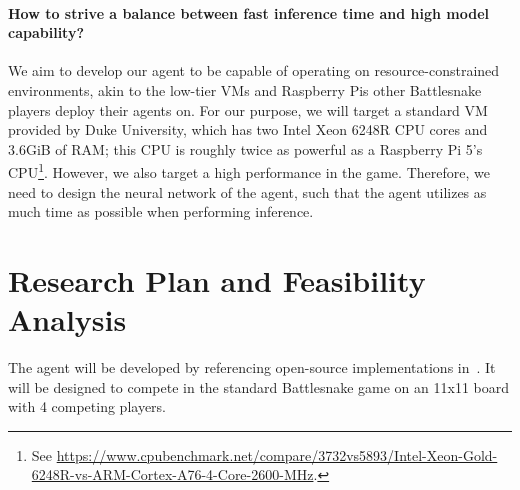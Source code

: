\documentclass[a4paper]{article}
\newcommand{\todo}[1]{\textcolor{red}{[ #1 ]}}
\renewcommand{\todo}[1]{} %
\begin{document}
\paragraph{How to strive a balance between fast inference time and high model
    capability?
}
We aim to develop our agent to be capable of operating on resource-constrained
environments,
akin to the low-tier VMs and Raspberry Pis other Battlesnake players deploy
their agents on. For our purpose,
we will target a standard VM provided by Duke University,
which has two Intel Xeon 6248R CPU cores and 3.6GiB of RAM;
this CPU is roughly twice as powerful as a Raspberry Pi 5's CPU\footnote{See
    \url{https://www.cpubenchmark.net/compare/3732vs5893/Intel-Xeon-Gold-6248R-vs-ARM-Cortex-A76-4-Core-2600-MHz}.
}. However, we also target a high performance in the game. Therefore,
we need to design the neural network of the agent,
such that the agent utilizes as much time as possible when performing inference.

\section{Research Plan and Feasibility Analysis}

\todo{including research methods, technical routes, experimental methods,
    key technologies, etc.}

The agent will be developed by referencing open-source implementations
in~\cite{siddiqui2020multiagent,chung2020battlesnake,wrenger2024rusty}.
It will be designed to compete in the standard Battlesnake game on an 11x11
board with 4 competing players.
\end{document}
